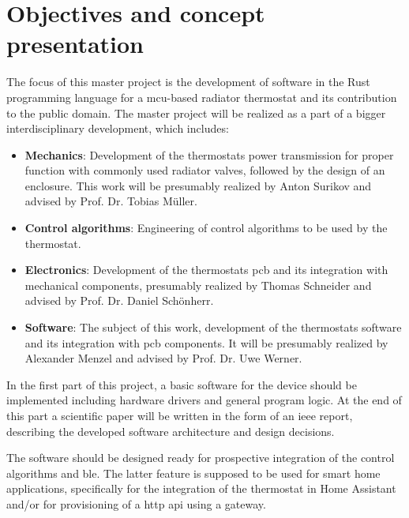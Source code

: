 %
%

\chapter{Objectives and concept presentation}
\label{chap:Objectives and concept presentation}
%
The focus of this master project is the development of software in the Rust programming language for a \ac{mcu}-based radiator thermostat and its contribution to the public domain. The master project will be realized as a part of a bigger interdisciplinary development, which includes:

\begin{itemize}
	\item \textbf{Mechanics}: Development of the thermostats power transmission for proper function with commonly used radiator valves, followed by the design of an enclosure. This work will be presumably realized by Anton Surikov and advised by Prof. Dr. Tobias Müller.
	\item \textbf{Control algorithms}: Engineering of control algorithms to be used by the thermostat.
	\item \textbf{Electronics}: Development of the thermostats \acs{pcb} and its integration with mechanical components, presumably realized by Thomas Schneider and advised by Prof. Dr. Daniel Schönherr.
	\item \textbf{Software}: The subject of this work, development of the thermostats software and its integration with \acs{pcb} components. It will be presumably realized by Alexander Menzel and advised by Prof. Dr. Uwe Werner.
\end{itemize}

In the first part of this project, a basic software for the device should be implemented including hardware drivers and general program logic. At the end of this part a scientific paper will be written in the form of an \ac{ieee} report, describing the developed software architecture and design decisions.

The software should be designed ready for prospective integration of the control algorithms and \ac{ble}. The latter feature is supposed to be used for smart home applications, specifically for the integration of the thermostat in Home Assistant and/or for provisioning of a \ac{http} \ac{api} using a gateway.

